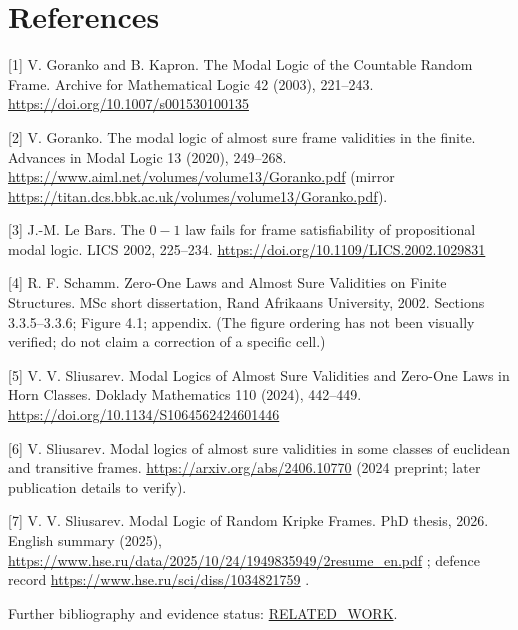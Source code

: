 \documentclass[11pt]{article}
\begin{document}
\section*{References}

[1] V. Goranko and B. Kapron. The Modal Logic of the Countable Random Frame. Archive for Mathematical Logic 42 (2003), 221--243. \url{https://doi.org/10.1007/s001530100135}

[2] V. Goranko. The modal logic of almost sure frame validities in the finite. Advances in Modal Logic 13 (2020), 249--268. \url{https://www.aiml.net/volumes/volume13/Goranko.pdf} (mirror \url{https://titan.dcs.bbk.ac.uk/volumes/volume13/Goranko.pdf}).

[3] J.-M. Le Bars. The $0-1$ law fails for frame satisfiability of propositional modal logic. LICS 2002, 225--234. \url{https://doi.org/10.1109/LICS.2002.1029831}

[4] R. F. Schamm. Zero-One Laws and Almost Sure Validities on Finite Structures. MSc short dissertation, Rand Afrikaans University, 2002. Sections 3.3.5--3.3.6; Figure 4.1; appendix. (The figure ordering has not been visually verified; do not claim a correction of a specific cell.)

[5] V. V. Sliusarev. Modal Logics of Almost Sure Validities and Zero-One Laws in Horn Classes. Doklady Mathematics 110 (2024), 442--449. \url{https://doi.org/10.1134/S1064562424601446}

[6] V. Sliusarev. Modal logics of almost sure validities in some classes of euclidean and transitive frames. \url{https://arxiv.org/abs/2406.10770} (2024 preprint; later publication details to verify).

[7] V. V. Sliusarev. Modal Logic of Random Kripke Frames. PhD thesis, 2026. English summary (2025), \url{https://www.hse.ru/data/2025/10/24/1949835949/2resume_en.pdf} ; defence record \url{https://www.hse.ru/sci/diss/1034821759} .

Further bibliography and evidence status: \href{../docs/RELATED\_WORK.md}{RELATED\_WORK}.
\end{document}
